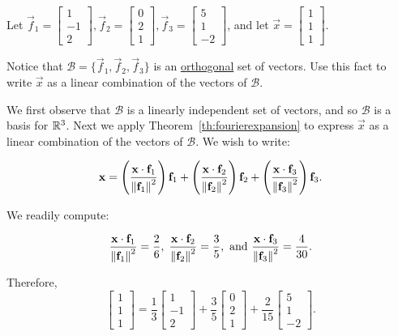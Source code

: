 \documentclass{ximera}
\begin{document}
\begin{example}\label{fourier}
Let
$\vec{f}_1= \begin{bmatrix}
1 \\ -1 \\ 2
\end{bmatrix},
\vec{f}_2= \begin{bmatrix}
0 \\ 2 \\ 1 
\end{bmatrix},
\vec{f}_3 =\begin{bmatrix}
5 \\ 1 \\ -2
\end{bmatrix}$,
and let
$\vec{x} =\begin{bmatrix}
1 \\ 1 \\ 1
\end{bmatrix}$.  

Notice that $\mathcal{B}=\{ \vec{f}_1, \vec{f}_2, \vec{f}_3\}$
is an \underline{orthogonal} set of vectors.  Use this fact to write $\vec{x}$ as  a linear combination of the vectors of $\mathcal{B}$.

\begin{explanation}
We first observe that $\mathcal{B}$ is a linearly independent set of vectors, and so $\mathcal{B}$ is a basis for $\mathbb{R}^3$. Next we apply Theorem~\ref{th:fourierexpansion} to express $\vec{x}$ as  a linear combination of the vectors of $\mathcal{B}$.  We wish to write:

\[
\mathbf{x}   =
\left(\frac{\mathbf{x}\cdot \mathbf{f}_1}{\left\lVert\mathbf{f}_1\right\rVert^2}\right) \mathbf{f}_1 +
\left(\frac{\mathbf{x}\cdot \mathbf{f}_2}{\left\lVert\mathbf{f}_2\right\rVert^2}\right) \mathbf{f}_2 +
\left(\frac{\mathbf{x}\cdot \mathbf{f}_3}{\left\lVert\mathbf{f}_3\right\rVert^2}\right) \mathbf{f}_3.
\]

We readily compute:

\[
\frac{\mathbf{x}\cdot\mathbf{f}_1}{\left\lVert\mathbf{f}_1\right\rVert^2} = \frac{2}{6}, \;
\frac{\mathbf{x}\cdot\mathbf{f}_2}{\left\lVert\mathbf{f}_2\right\rVert^2} = \frac{3}{5},
\mbox{ and }
\frac{\mathbf{x}\cdot\mathbf{f}_3}{\left\lVert\mathbf{f}_3\right\rVert^2} = \frac{4}{30}.\]

Therefore,
\[ \begin{bmatrix}
1 \\ 1 \\ 1
\end{bmatrix}
= \frac{1}{3}\begin{bmatrix}
1 \\ -1 \\ 2
\end{bmatrix}
+\frac{3}{5}\begin{bmatrix}
0 \\ 2 \\ 1
\end{bmatrix}
+\frac{2}{15}\begin{bmatrix}
5 \\ 1 \\ -2
\end{bmatrix}.\]
\end{explanation} 
\end{example}
\end{document}
